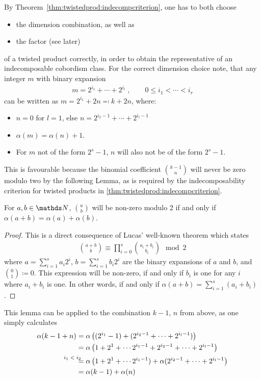 By Theorem~\autoref{thm:twistedprod:indecompcriterion}, one has to
both choose
\begin{itemize}
\item the dimension combination, as well as
\item the factor (see later)
\end{itemize}
of a twisted product correctly, in order to obtain the representative
of an indecomposable cobordism class.
For the correct dimension choice note, that any integer $m$ with
binary expansion
\begin{gather*}
  m=2^{i_1}+\dotsb+2^{i_l}
  \;,\qquad
  0 \leq i_1<\dotsb<i_r
\end{gather*}
can be written as $m=2^{i_1}+2n\eqqcolon k+2n$, where:
\begin{itemize}
\item $n=0$ for $l=1$, else $n=2^{i_2-1}+\dotsb+2^{i_l-1}$
\item $\alpha(m)=\alpha(n)+1$.
\item For $m$ not of the form $2^s-1$, $n$ will also not be of the
  form $2^s-1$.
\end{itemize}
This is favourable because the binomial coefficient
$\binom{k-1}{n}$ will never be zero modulo two by the following Lemma,
as is required by the indecomposability criterion for twisted products
in \autoref{thm:twistedprod:indecompcriterion}.
\begin{Lem}
  For $a,b\in\Nat$, $\binom{a}{b}$ will be non-zero modulo 2 if and only
  if $\alpha(a+b)=\alpha(a)+\alpha(b)$.
  \begin{proof}
    This is a direct consequence of Lucas' well-known theorem
    which states
    \begin{gather*}
      \binom{a+b}{b} \equiv \prod_{i=0}^s \binom{a_i+b_i}{b_i} \mod 2
    \end{gather*}
    where $a=\sum_{i=1}^s a_i2^{i}$, $b=\sum_{i=1}^s b_i2^{i}$ are the
    binary expansions of $a$ and $b$, and $\binom{0}{1}\coloneqq 0$.
    This expression will be non-zero, if and only if $b_i$ is one for
    any $i$ where $a_i+b_i$ is one. In other words, if and only if
    $\alpha(a+b)=\sum_{i=1}^s(a_i+b_i)$.    
  \end{proof}
\end{Lem}
This lemma can be applied to the combination $k-1$, $n$ from above, as one
simply calculates
\begin{align*}
  \alpha(k-1+n)
  &= \alpha\left((2^{i_1}-1)+ (2^{i_2-1}+\dotsb+2^{i_l-1})\right) \\
  &= \alpha\left(1+2^1+\dotsb 2^{i_1-1} + 2^{i_2-1}+\dotsb+2^{i_l-1}\right) \\
  &\equalsby{$i_1<i_2$}
  \alpha\left(1+2^1+\dotsb 2^{i_1-1}) + \alpha(2^{i_2-1}+\dotsb+2^{i_l-1}\right)\\
  &= \alpha(k-1) + \alpha(n)
\end{align*}

